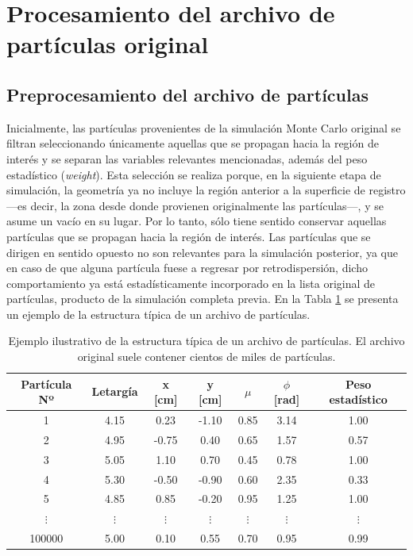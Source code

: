 \section{Procesamiento del archivo de partículas original}
\subsection{Preprocesamiento del archivo de partículas}
Inicialmente, las partículas provenientes de la simulación Monte Carlo original se filtran seleccionando únicamente aquellas que se propagan hacia la región de interés y se separan las variables relevantes mencionadas, además del peso estadístico (\textit{weight}). Esta selección se realiza porque, en la siguiente etapa de simulación, la geometría ya no incluye la región anterior a la superficie de registro —es decir, la zona desde donde provienen originalmente las partículas—, y se asume un vacío en su lugar. Por lo tanto, sólo tiene sentido conservar aquellas partículas que se propagan hacia la región de interés. Las partículas que se dirigen en sentido opuesto no son relevantes para la simulación posterior, ya que en caso de que alguna partícula fuese a regresar por retrodispersión, dicho comportamiento ya está estadísticamente incorporado en la lista original de partículas, producto de la simulación completa previa. En la Tabla \ref{tab:estructura_trackfile} se presenta un ejemplo de la estructura típica de un archivo de partículas.

\begin{table}[h]
    \centering
    \begin{tabular}{ccccccc}
        \toprule
        \textbf{Partícula Nº} & \textbf{Letargía} & \textbf{x [cm]} & \textbf{y [cm]} & \textbf{$\mu$} & \textbf{$\phi$ [rad]} & \textbf{Peso estadístico} \\ 
        \midrule
        1       & 4.15 &  0.23  & -1.10 &  0.85 & 3.14 & 1.00 \\
        2       & 4.95 & -0.75  &  0.40 & 0.65 & 1.57 & 0.57 \\
        3       & 5.05 &  1.10  &  0.70 &  0.45 & 0.78 & 1.00 \\
        4       & 5.30 & -0.50  & -0.90 &  0.60 & 2.35 & 0.33 \\
        5       & 4.85 &  0.85  & -0.20 & 0.95 & 1.25 & 1.00 \\
        $\vdots$ & $\vdots$ & $\vdots$ & $\vdots$ & $\vdots$ & $\vdots$ & $\vdots$ \\[0.2cm]
        100000  & 5.00 &  0.10  &  0.55 & 0.70 & 0.95 & 0.99 \\
        \bottomrule
    \end{tabular}
    \caption{Ejemplo ilustrativo de la estructura típica de un archivo de partículas. El archivo original suele contener cientos de miles de partículas.}
    \label{tab:estructura_trackfile}
\end{table}

